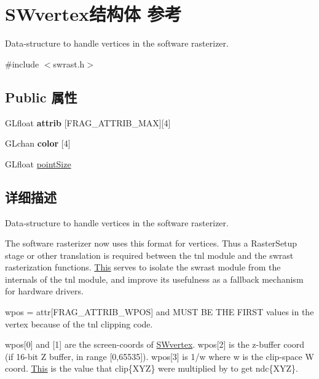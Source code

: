 \hypertarget{struct_s_wvertex}{}\section{S\+Wvertex结构体 参考}
\label{struct_s_wvertex}


Data-\/structure to handle vertices in the software rasterizer.  




{\ttfamily \#include $<$swrast.\+h$>$}

\subsection*{Public 属性}
\begin{DoxyCompactItemize}
\item 
\mbox{\label{struct_s_wvertex_ae5a42a5bb68f7a9ecf3f659fbd548365}} 
G\+Lfloat {\bfseries attrib} \mbox{[}F\+R\+A\+G\+\_\+\+A\+T\+T\+R\+I\+B\+\_\+\+M\+AX\mbox{]}\mbox{[}4\mbox{]}
\item 
\mbox{\label{struct_s_wvertex_ae0eae898075b1491de5f5a0b4dcf2899}} 
G\+Lchan {\bfseries color} \mbox{[}4\mbox{]}
\item 
G\+Lfloat \hyperlink{struct_s_wvertex_a5af8503a89227ee0f4524cf17db6d3e8}{point\+Size}
\end{DoxyCompactItemize}


\subsection{详细描述}
Data-\/structure to handle vertices in the software rasterizer. 

The software rasterizer now uses this format for vertices. Thus a \textquotesingle{}Raster\+Setup\textquotesingle{} stage or other translation is required between the tnl module and the swrast rasterization functions. \hyperlink{namespace_this}{This} serves to isolate the swrast module from the internals of the tnl module, and improve its usefulness as a fallback mechanism for hardware drivers.

wpos = attr\mbox{[}F\+R\+A\+G\+\_\+\+A\+T\+T\+R\+I\+B\+\_\+\+W\+P\+OS\mbox{]} and M\+U\+ST BE T\+HE F\+I\+R\+ST values in the vertex because of the tnl clipping code.

wpos\mbox{[}0\mbox{]} and \mbox{[}1\mbox{]} are the screen-\/coords of \hyperlink{struct_s_wvertex}{S\+Wvertex}. wpos\mbox{[}2\mbox{]} is the z-\/buffer coord (if 16-\/bit Z buffer, in range \mbox{[}0,65535\mbox{]}). wpos\mbox{[}3\mbox{]} is 1/w where w is the clip-\/space W coord. \hyperlink{namespace_this}{This} is the value that clip\{X\+YZ\} were multiplied by to get ndc\{X\+YZ\}.

